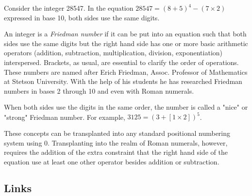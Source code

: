 \documentclass[12pt]{article}
\begin{document}
Consider the integer 28547. In the equation $28547 = (8+5)^{4}-(7 \times 2)$ expressed in base 10, both sides use the same digits.

An integer is a {\em Friedman number} if it can be put into an equation such that both sides use the same digits but the right hand side has one or more basic arithmetic operators (addition, subtraction, multiplication, division, exponentiation) interspersed. Brackets, as usual, are essential to clarify the order of operations. These numbers are named after Erich Friedman, Assoc. Professor of
Mathematics at Stetson University. With the help of his students he has researched Friedman numbers in bases 2 through 10 and even with Roman numerals.

When both sides use the digits in the same order, the number is called a "nice" or "strong" Friedman number. For example, $3125=(3 + [1 \times 2])^5$.

These concepts can be transplanted into any standard positional numbering system using 0. Transplanting into the realm of Roman numerals, however, requires the addition of the extra constraint that the right hand side of the equation use at least one other operator besides addition or subtraction. 


\subsection{Links}



\end{document}

